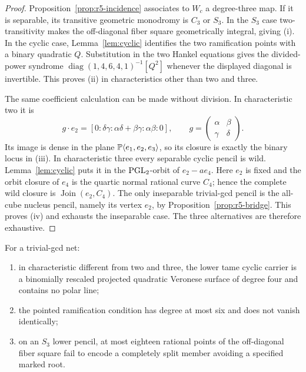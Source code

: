 \begin{proof}
Proposition~\ref{prop:r5-incidence} associates to \(W_c\) a degree-three
map.  If it is separable, its transitive geometric monodromy is
\(C_3\) or \(S_3\).  In the \(S_3\) case two-transitivity makes the
off-diagonal fiber square geometrically integral, giving (i).
In the cyclic case, Lemma~\ref{lem:cyclic} identifies the two
ramification points with a binary quadratic \(Q\).  Substitution in the
two Hankel equations gives the divided-power syndrome
\(\operatorname{diag}(1,4,6,4,1)^{-1}[Q^2]\) whenever the displayed
diagonal is invertible.  This proves (ii) in characteristics other than
two and three.

The same coefficient calculation can be made without division.  In
characteristic two it is
\[
 g\cdot e_2=
 [0:\delta\gamma:\alpha\delta+\beta\gamma:\alpha\beta:0],
 \qquad
 g=\begin{pmatrix}\alpha&\beta\\ \gamma&\delta\end{pmatrix}.
\]
Its image is dense in the plane
\(\mathbb P\langle e_1,e_2,e_3\rangle\), so its closure is exactly the
binary locus in (iii).  In characteristic three every separable
cyclic pencil is wild.  Lemma~\ref{lem:cyclic} puts it in the
\(\operatorname{PGL}_2\)-orbit of \(e_2-ae_4\).  Here \(e_2\) is fixed and the orbit
closure of \(e_4\) is the quartic normal rational curve \(C_4\);
hence the complete wild closure is
\(\operatorname{Join}(e_2,C_4)\).  The only inseparable trivial-gcd
pencil is the all-cube nucleus pencil, namely its vertex \(e_2\), by
Proposition~\ref{prop:r5-bridge}.  This proves (iv) and exhausts the
inseparable case.  The three alternatives are therefore exhaustive.
\end{proof}

\begin{proposition}\label{prop:r6-degrees}%
%
For a trivial-gcd net:
\begin{enumerate}[label=\textup{(\roman*)}]
\item in characteristic different from two and three, the lower tame cyclic
carrier is a binomially rescaled projected quadratic Veronese surface
of degree four and
contains no polar line;
\item the pointed ramification condition has degree at most six and
does not vanish identically;
\item on an $S_3$ lower pencil, at most eighteen rational points of the
off-diagonal fiber square fail to encode a completely split member avoiding a
specified marked root.
\end{enumerate}
\end{proposition}


